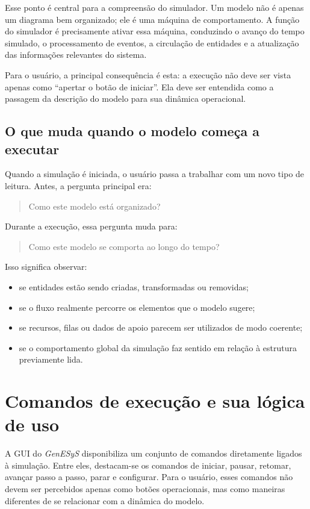 Esse ponto é central para a compreensão do simulador. Um modelo não é apenas um diagrama bem organizado; ele é uma máquina de comportamento. A função do simulador é precisamente ativar essa máquina, conduzindo o avanço do tempo simulado, o processamento de eventos, a circulação de entidades e a atualização das informações relevantes do sistema.

Para o usuário, a principal consequência é esta: a execução não deve ser vista apenas como “apertar o botão de iniciar”. Ela deve ser entendida como a passagem da descrição do modelo para sua dinâmica operacional.

\subsection{O que muda quando o modelo começa a executar}
\label{subsec:cap5_o_que_muda_quando_executa}

Quando a simulação é iniciada, o usuário passa a trabalhar com um novo tipo de leitura. Antes, a pergunta principal era:
\begin{quote}
    Como este modelo está organizado?
\end{quote}

Durante a execução, essa pergunta muda para:
\begin{quote}
    Como este modelo se comporta ao longo do tempo?
\end{quote}

Isso significa observar:
\begin{itemize}
    \item se entidades estão sendo criadas, transformadas ou removidas;
    \item se o fluxo realmente percorre os elementos que o modelo sugere;
    \item se recursos, filas ou dados de apoio parecem ser utilizados de modo coerente;
    \item se o comportamento global da simulação faz sentido em relação à estrutura previamente lida.
\end{itemize}

\section{Comandos de execução e sua lógica de uso}
\label{sec:cap5_comandos_execucao_logica}

A GUI do \textit{GenESyS} disponibiliza um conjunto de comandos diretamente ligados à simulação. Entre eles, destacam-se os comandos de iniciar, pausar, retomar, avançar passo a passo, parar e configurar. Para o usuário, esses comandos não devem ser percebidos apenas como botões operacionais, mas como maneiras diferentes de se relacionar com a dinâmica do modelo.

